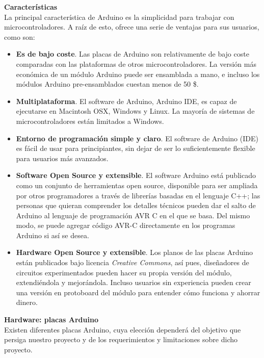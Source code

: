 \documentclass[12pt]{article}
\begin{document}
	
	\noindent \textbf{\large Características} \\
	
	\noindent La principal característica de Arduino es la simplicidad para trabajar con microcontroladores. A raíz de esto, ofrece una serie de ventajas para sus usuarios, como son:
	\begin{itemize}
		\item \textbf{Es de bajo coste}. Las placas de Arduino son relativamente de bajo coste comparadas con las plataformas de otros microcontroladores. La versión más económica de un módulo Arduino puede ser ensamblada a mano, e incluso los módulos Arduino pre-ensamblados cuestan menos de 50 \$.
		\item \textbf{Multiplataforma}. El software de Arduino, Arduino IDE, es capaz de ejecutarse en Macintosh OSX, Windows y Linux. La mayoría de sistemas de microcontroladores están limitados a Windows.
		\item  	\textbf{Entorno de programación simple y claro}. El software de Arduino (IDE) es fácil de usar para principiantes, sin dejar de ser lo suficientemente flexible para usuarios más avanzados.
		\item \textbf{Software Open Source y extensible}. El software Arduino está publicado como un conjunto de herramientas open source, disponible para ser ampliada por otros programadores a través de librerías basadas en el lenguaje C++; las personas que quieran comprender los detalles técnicos pueden dar el salto de Arduino al lenguaje de programación AVR C en el que se basa. Del mismo modo, se puede agregar código AVR-C directamente en los  programas Arduino si así se desea.
		\item \textbf{Hardware Open Source y extensible}. Los planos de las placas Arduino están publicados bajo licencia \textit{Creative Commons}, así pues, diseñadores de circuitos experimentados pueden hacer su propia versión del módulo, extendiéndola y mejorándola. Incluso usuarios sin experiencia pueden crear una versión en protoboard del módulo para entender cómo funciona y ahorrar dinero.
	
	\end{itemize}

	\noindent \textbf{\large Hardware: placas Arduino} \\
	
	\noindent Existen diferentes placas Arduino, cuya elección dependerá del objetivo que persiga nuestro proyecto y de los requerimientos y limitaciones sobre dicho proyecto. \\
	
\end{document}

